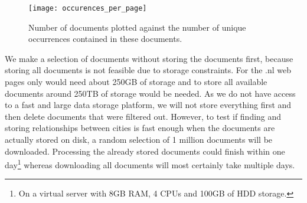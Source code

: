 \begin{figure}[H]
    \centering
    \texttt{[image: occurences\_per\_page]}
    \caption{Number of documents plotted against the number of unique occurrences contained in these documents.}
    \label{fig:occ_per_page}
\end{figure}

We make a selection of documents without storing the documents first, because storing all documents is not feasible due to storage constraints. For the .nl web pages only would need about 250GB of storage and to store all available documents around 250TB of storage would be needed. As we do not have access to a fast and large data storage platform, we will not store everything first and then delete documents that were filtered out. However, to test if finding and storing relationships between cities is fast enough when the documents are actually stored on disk, a random selection of 1 million documents will be downloaded. Processing the already stored documents could finish within one day\footnote{On a virtual server with 8GB RAM, 4 CPUs and 100GB of HDD storage.} whereas downloading all documents will most certainly take multiple days.




